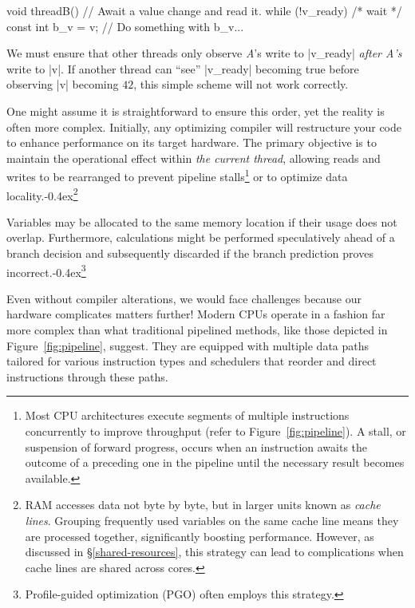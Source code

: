 \documentclass[fontsize=10pt, oneside]{scrartcl}
\newcommand{\punckern}{\kern-0.4ex}
\newcommand{\cplusplus}[1]{C\kern-0.1ex\raisebox{0.15ex}{\texttt{++}}#1}
\newcommand{\fig}[1]{Figure~\ref{#1}}
\newcommand{\introduce}[1]{\textit{#1}}
\newcommand{\secref}[1]{\hyperref[#1]{\textsc{\S}\ref*{#1}}}
\begin{document}
\begin{ccode}
void threadB()
{
    // Await a value change and read it.
    while (!v_ready) { /* wait */ }
    const int b_v = v;
    // Do something with b_v...
}
\end{ccode}
We must ensure that other threads only observe \textit{A}'s write to \cc|v_ready| \emph{after A's} write to \cc|v|.
If another thread can ``see'' \cc|v_ready| becoming true before observing \cc|v| becoming $42$,
this simple scheme will not work correctly.

One might assume it is straightforward to ensure this order,
yet the reality is often more complex.
Initially, any optimizing compiler will restructure your code to enhance performance on its target hardware.
The primary objective is to maintain the operational effect within \emph{the current thread},
allowing reads and writes to be rearranged to prevent pipeline stalls\footnote{%
Most \textsc{CPU} architectures execute segments of multiple instructions concurrently to improve throughput (refer to \fig{fig:pipeline}).
A stall, or suspension of forward progress, occurs when an instruction awaits the outcome of a preceding one in the pipeline until the necessary result becomes available.} or to optimize data locality.\punckern\footnote{%
\textsc{RAM} accesses data not byte by byte, but in larger units known as \introduce{cache lines}.
Grouping frequently used variables on the same cache line means they are processed together,
significantly boosting performance. However, as discussed in \secref{shared-resources},
this strategy can lead to complications when cache lines are shared across cores.}

Variables may be allocated to the same memory location if their usage does not overlap.
Furthermore, calculations might be performed speculatively ahead of a branch decision and subsequently discarded if the branch prediction proves incorrect.\punckern\footnote{%
Profile-guided optimization (PGO) often employs this strategy.}

Even without compiler alterations,
we would face challenges because our hardware complicates matters further!
Modern \textsc{CPU}s operate in a fashion far more complex than what traditional pipelined methods,
like those depicted in \fig{fig:pipeline}, suggest.
They are equipped with multiple data paths tailored for various instruction types and schedulers that reorder and direct instructions through these paths.
\end{document}
